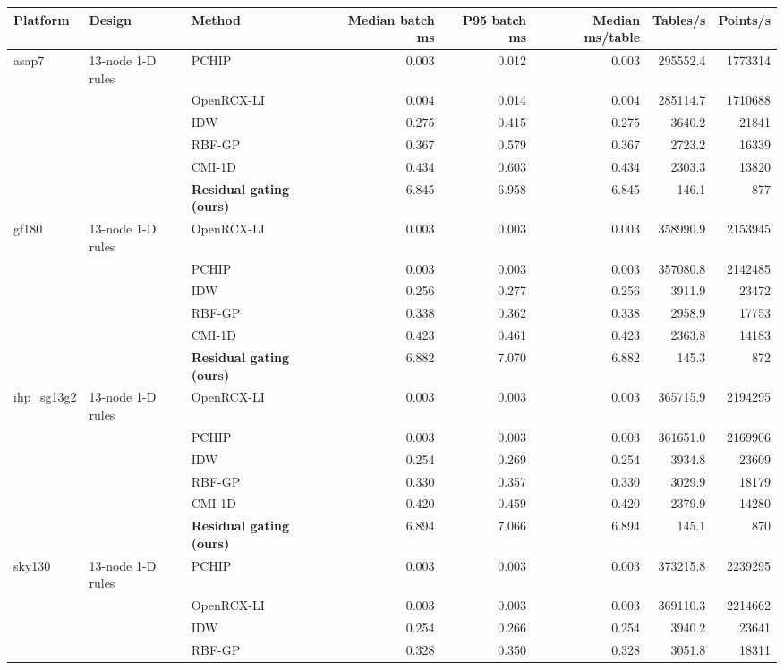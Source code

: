 \small
\setlength{\tabcolsep}{3pt}\scriptsize
\begin{tabular}{lllrrrrr}\toprule
Platform & Design & Method & Median batch ms & P95 batch ms & Median ms/table & Tables/s & Points/s \\\midrule
asap7 & 13-node 1-D rules & PCHIP & 0.003 & 0.012 & 0.003 & 295552.4 & 1773314 \\
 &  & OpenRCX-LI & 0.004 & 0.014 & 0.004 & 285114.7 & 1710688 \\
 &  & IDW & 0.275 & 0.415 & 0.275 & 3640.2 & 21841 \\
 &  & RBF-GP & 0.367 & 0.579 & 0.367 & 2723.2 & 16339 \\
 &  & CMI-1D & 0.434 & 0.603 & 0.434 & 2303.3 & 13820 \\
 &  & \textbf{Residual gating (ours)} & 6.845 & 6.958 & 6.845 & 146.1 & 877 \\
\midrule
gf180 & 13-node 1-D rules & OpenRCX-LI & 0.003 & 0.003 & 0.003 & 358990.9 & 2153945 \\
 &  & PCHIP & 0.003 & 0.003 & 0.003 & 357080.8 & 2142485 \\
 &  & IDW & 0.256 & 0.277 & 0.256 & 3911.9 & 23472 \\
 &  & RBF-GP & 0.338 & 0.362 & 0.338 & 2958.9 & 17753 \\
 &  & CMI-1D & 0.423 & 0.461 & 0.423 & 2363.8 & 14183 \\
 &  & \textbf{Residual gating (ours)} & 6.882 & 7.070 & 6.882 & 145.3 & 872 \\
\midrule
ihp\_sg13g2 & 13-node 1-D rules & OpenRCX-LI & 0.003 & 0.003 & 0.003 & 365715.9 & 2194295 \\
 &  & PCHIP & 0.003 & 0.003 & 0.003 & 361651.0 & 2169906 \\
 &  & IDW & 0.254 & 0.269 & 0.254 & 3934.8 & 23609 \\
 &  & RBF-GP & 0.330 & 0.357 & 0.330 & 3029.9 & 18179 \\
 &  & CMI-1D & 0.420 & 0.459 & 0.420 & 2379.9 & 14280 \\
 &  & \textbf{Residual gating (ours)} & 6.894 & 7.066 & 6.894 & 145.1 & 870 \\
\midrule
sky130 & 13-node 1-D rules & PCHIP & 0.003 & 0.003 & 0.003 & 373215.8 & 2239295 \\
 &  & OpenRCX-LI & 0.003 & 0.003 & 0.003 & 369110.3 & 2214662 \\
 &  & IDW & 0.254 & 0.266 & 0.254 & 3940.2 & 23641 \\
 &  & RBF-GP & 0.328 & 0.350 & 0.328 & 3051.8 & 18311 \\

\end{tabular}
